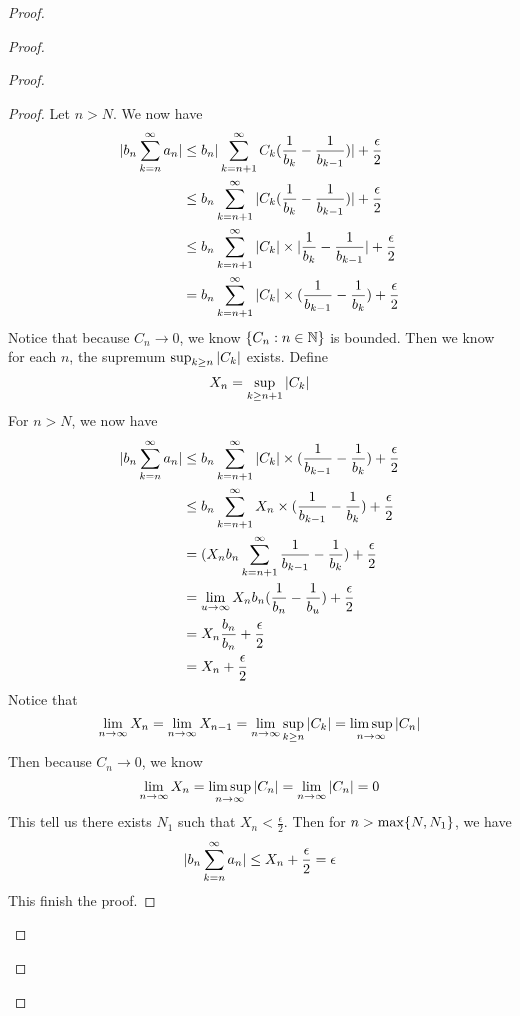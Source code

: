\documentclass{report}
\begin{document}
\begin{proof}
\begin{proof}
\begin{proof}
\begin{proof}
Let $n>N$. We now have
 \begin{align}
   |b_n\sum_{k=n}^\infty a_n|&\leq b_n|\sum_{k=n+1}^\infty C_k(\frac{1}{b_k}-\frac{1}{b_{k-1}})|+\frac{\epsilon}{2}\\
&\leq b_n\sum_{k=n+1}^\infty |C_k(\frac{1}{b_k}-\frac{1}{b_{k-1}})|+\frac{\epsilon}{2}\\
&\leq b_n\sum_{k=n+1}^\infty |C_k| \times|\frac{1}{b_k}-\frac{1}{b_{k-1}}|+\frac{\epsilon}{2}\\
&= b_n\sum_{k=n+1}^\infty |C_k|\times (\frac{1}{b_{k-1}}-\frac{1}{b_k})+\frac{\epsilon}{2}
\end{align}
Notice that because $C_n\to 0$, we know  $\{ C_n:n\in\mathbb{N} \}$ is bounded. Then we know for each $n$, the supremum  $\sup_{k\geq n} |C_k|$ exists. Define
\begin{equation}
X_n=\sup_{k\geq n+1}|C_k|
\end{equation}
For $n>N$, we now have
 \begin{align}
   |b_n\sum_{k=n}^\infty a_n|&\leq b_n\sum_{k=n+1}^\infty |C_k|\times (\frac{1}{b_{k-1}}-\frac{1}{b_k})+\frac{\epsilon}{2}\\
                                  &\leq b_n\sum_{k=n+1}^\infty X_n \times (\frac{1}{b_{k-1}}-\frac{1}{b_k})+\frac{\epsilon}{2}\\
   &=(X_nb_n\sum_{k=n+1}^\infty \frac{1}{b_{k-1}}-\frac{1}{b_k}) +\frac{\epsilon}{2}\\
   &=\lim_{u\to\infty} X_nb_n (\frac{1}{b_n}-\frac{1}{b_u})+\frac{\epsilon}{2}\\
   &=X_n \frac{b_n}{b_n}+\frac{\epsilon}{2}\\
   &=X_n+\frac{\epsilon}{2}
\end{align}
Notice that 
\begin{equation}
\lim_{n\to\infty}X_n=\lim_{n\to\infty}X_{n-1}=\lim_{n\to\infty}\sup_{k\geq n}|C_k|=\limsup_{n\to\infty} |C_n|
\end{equation}
Then because $C_n\to 0$, we know 
 \begin{equation}
\lim_{n\to\infty}X_n=\limsup_{n\to\infty} |C_n|=\lim_{n\to\infty}|C_n|=0
\end{equation}
This tell us there exists $N_1$ such that  $X_n<\frac{\epsilon}{2}$. Then for $n>\max \{ N,N_1 \}$, we have
\begin{equation}
|b_n\sum_{k=n}^\infty a_n|\leq X_n+\frac{\epsilon}{2}=\epsilon 
\end{equation}
This finish the proof. 
\end{proof}

\end{proof}
\end{proof}
\end{proof}
\end{document}
